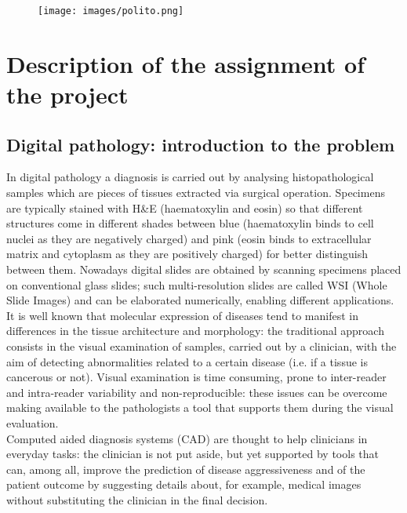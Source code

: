 \documentclass[12pt]{article}
\begin{document}
\begin{figure}
  \centering
  \texttt{[image: images/polito.png]}
\end{figure}

\maketitle

\newpage
\tableofcontents
\listoffigures

\newpage

\section{Description of the assignment of the project}
\subsection{Digital pathology: introduction to the problem}
In digital pathology a diagnosis is carried out by analysing histopathological samples which are pieces of tissues extracted via surgical operation. Specimens are typically stained with H\&E (haematoxylin and eosin) so that different structures come in different shades between blue (haematoxylin binds to cell nuclei as they are negatively charged) and pink (eosin binds to extracellular matrix and cytoplasm as they are positively charged) for better distinguish between them. Nowadays digital slides are obtained by scanning specimens placed on conventional glass slides; such multi-resolution slides are called WSI (Whole Slide Images) and can be elaborated numerically, enabling different applications.\\ 
It is well known that molecular expression of diseases tend to manifest in differences in the tissue architecture and morphology: the traditional approach consists in the visual examination of samples, carried out by a clinician, with the aim of detecting abnormalities related to a certain disease (i.e. if a tissue is cancerous or not). Visual examination is time consuming, prone to inter-reader and intra-reader variability and non-reproducible: these issues can be overcome making available to the pathologists a tool that supports them during the visual evaluation.\\
Computed aided diagnosis systems (CAD) are thought to help clinicians in everyday tasks: the clinician is not put aside, but yet supported by tools that can, among all, improve the prediction of disease aggressiveness and of the patient outcome by suggesting details about, for example, medical images without substituting the clinician in the final decision.
\end{document}
